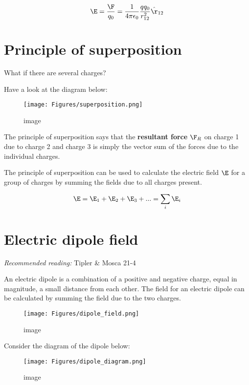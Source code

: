 \documentclass[
]{book}
\theoremstyle{definition}
\theoremstyle{definition}
\theoremstyle{definition}
\theoremstyle{definition}
\theoremstyle{remark}
\begin{document}
\[\begin{aligned}
\E = \frac{\F}{q_0} = \frac{1}{4\pi \epsilon_0} \frac{q q_0}{r_{12}^2} \hat{\r}_{12}
\end{aligned}\]

\hypertarget{principle-of-superposition}{%
\section{Principle of superposition}\label{principle-of-superposition}}

What if there are several charges?

Have a look at the diagram below:

\begin{figure}
\centering
\texttt{[image: Figures/superposition.png]}
\caption{image}
\end{figure}

The principle of superposition says that the \textbf{resultant force} \(\F_R\)
on charge 1 due to charge 2 and charge 3 is simply the vector sum of the
forces due to the individual charges.

The principle of superposition can be used to calculate the electric
field \(\E\) for a group of charges by summing the fields due to all
charges present.

\[\begin{aligned}
\E = \E_1 + \E_2 + \E_3 + ... = \sum_i \E_i
\end{aligned}\]

\hypertarget{electric-dipole-field}{%
\section{Electric dipole field}\label{electric-dipole-field}}

\emph{Recommended reading:} Tipler \& Mosca 21-4

An electric dipole is a combination of a positive and negative charge,
equal in magnitude, a small distance from each other. The field for an
electric dipole can be calculated by summing the field due to the two
charges.

\begin{figure}
\centering
\texttt{[image: Figures/dipole\_field.png]}
\caption{image}
\end{figure}

Consider the diagram of the dipole below:

\begin{figure}
\centering
\texttt{[image: Figures/dipole\_diagram.png]}
\caption{image}
\end{figure}
\end{document}
